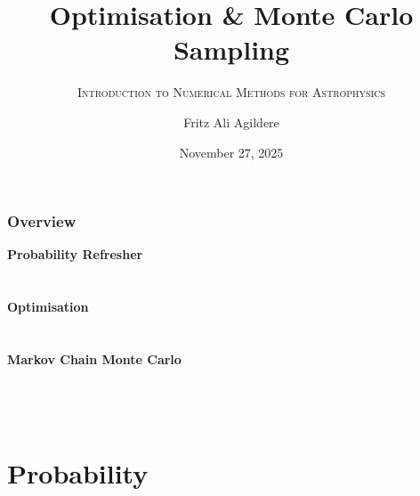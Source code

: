 

\author[F. A. Agildere]{Fritz Ali Agildere}

\date[Nov. 27, 2025]{November 27, 2025}

\title{Optimisation \& Monte Carlo Sampling}
\subtitle{\textsc{Introduction to Numerical Methods for Astrophysics}}

\institute[UNITOV]{}


	\begin{frame}[noframenumbering]
		\titlepage
	\end{frame}

	\begin{frame}
		\frametitle{Overview}
		\bfseries{Probability Refresher}\\[1.5pt]
		\hspace*{3ex}\\
		\hspace*{3ex}\\[3.0pt]
		\bfseries{Optimisation}\\[1.5pt]
		\hspace*{3ex}\\
		\hspace*{3ex}\\[3.0pt]
		\bfseries{Markov Chain Monte Carlo}\\[1.5pt]
		\hspace*{3ex}\\
		\hspace*{3ex}\\
		\hspace*{3ex}\\[3.0pt]
	\end{frame}

	\section{Probability}

